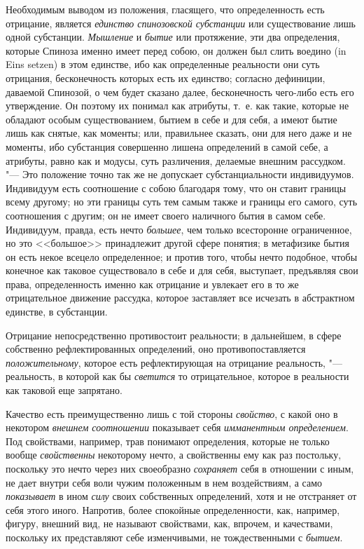Необходимым выводом из положения, гласящего, что определенность есть
отрицание, является {\em единство спинозовской
субстанции} или существование лишь одной субстанции.
{\em Мышление} и {\em бытие} или
протяжение, эти два определения, которые Спиноза именно имеет перед собою,
он должен был слить воедино (in Eins setzen) в этом единстве, ибо как
определенные реальности они суть отрицания, бесконечность которых есть их
единство; согласно дефиниции, даваемой Спинозой, о чем будет сказано далее,
бесконечность чего-либо есть его утверждение. Он поэтому их понимал как
атрибуты, т.~е. как такие, которые не обладают особым существованием,
бытием в себе и для себя, а имеют бытие лишь как снятые, как моменты; или,
правильнее сказать, они для него даже и не моменты, ибо субстанция
совершенно лишена определений в самой себе, а атрибуты, равно как и модусы,
суть различения, делаемые внешним рассудком. "--- Это положение точно так же
не допускает субстанциальности индивидуумов. Индивидуум есть соотношение с
собою благодаря тому, что он ставит границы всему другому; но эти границы
суть тем самым также и границы его самого, суть соотношения с другим; он не
имеет своего наличного бытия в самом себе. Индивидуум, правда, есть нечто
{\em большее}, чем только всесторонне ограниченное, но
это <<большое>> принадлежит другой сфере понятия; в метафизике бытия он есть
некое всецело определенное; и против того, чтобы нечто подобное, чтобы
конечное как таковое существовало в себе и для себя, выступает, предъявляя
свои права, определенность именно как отрицание и увлекает его в то же
отрицательное движение рассудка, которое заставляет все исчезать в
абстрактном единстве, в субстанции.

Отрицание непосредственно противостоит реальности; в дальнейшем, в сфере
собственно рефлектированных определений, оно противопоставляется
{\em положительному}, которое есть рефлектирующая на
отрицание реальность, "--- реальность, в которой как бы
{\em светится} то отрицательное, которое в реальности
как таковой еще запрятано.

Качество есть преимущественно лишь с той стороны
{\em свойство}, с какой оно в некотором
{\em внешнем соотношении} показывает себя
{\em имманентным определением}. Под свойствами,
например, трав понимают определения, которые не только вообще
{\em свойственны} некоторому нечто, а свойственны ему
как раз постольку, поскольку это нечто через них своеобразно
{\em сохраняет} себя в отношении с иным, не
дает внутри себя воли чужим положенным в нем воздействиям, а само
{\em показывает} в ином
{\em силу} своих собственных определений, хотя и не
отстраняет от себя этого иного. Напротив, более спокойные
определенности, как, например, фигуру, внешний вид, не называют
свойствами, как, впрочем, и качествами, поскольку их представляют себе
изменчивыми, не тождественными с {\em бытием}.

